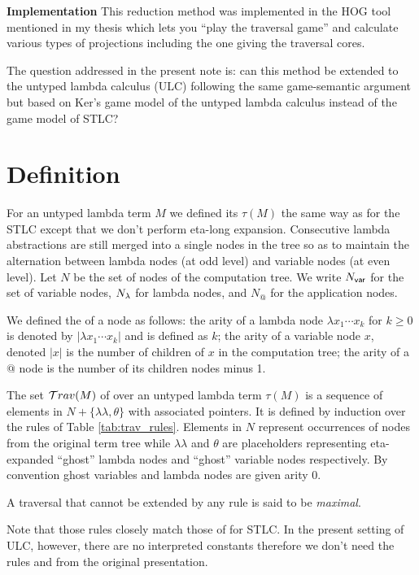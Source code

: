 \documentclass{article}
\theoremstyle{definition}
\newcommand\Nodes{N}%
\newcommand{\ghostlmd}{{\lambda\!\!\lambda}}
\newcommand{\ghostvar}{\theta}
\begin{document}
\textbf{Implementation}
This reduction method was implemented in the HOG tool mentioned in my thesis which lets you ``play the traversal game'' and calculate various types of projections including the one giving the traversal cores.

The question addressed in the present note is: can this method be extended to the untyped lambda calculus (ULC) following the same game-semantic argument but based on Ker's game model of the untyped lambda calculus instead of the game model of STLC?


\section{Definition}

For an untyped lambda term $M$ we defined its  $\tau(M)$ the same way as for the STLC
except that we don't perform eta-long expansion. Consecutive lambda abstractions are still merged into a single nodes in the tree so as to maintain the alternation between lambda nodes (at odd level) and variable nodes (at even level).
Let $\Nodes$ be the set of nodes of the computation tree. We write $\Nodes_{\sf var}$ for the set of variable nodes, $\Nodes_{\sf \lambda}$ for lambda nodes, and $\Nodes_{@}$ for the application nodes.

We defined the  of a node as follows: the arity of a lambda node $\lambda x_1 \cdots x_k$ for $k\geq 0$ is denoted by $|\lambda x_1 \cdots x_k|$ and is defined as $k$; the arity of a variable node $x$, denoted $|x|$ is the number of children of $x$ in the computation tree; the arity of a $@$ node is the number of its children nodes minus 1.

The set $\mathcal{T}rav(M)$ of  over an untyped lambda term $\tau(M)$ is a sequence of elements in $\Nodes + \{ \ghostlmd, \ghostvar \}$ with associated pointers. It is defined by induction over the rules of Table \ref{tab:trav_rules}.
Elements in $N$ represent occurrences of nodes from the original term tree while $\ghostlmd$ and $\ghostvar$ are placeholders representing eta-expanded ``ghost'' lambda nodes and ``ghost'' variable nodes respectively.
By convention ghost variables and lambda nodes are given arity $0$.

A traversal that cannot be extended by any rule is said to be \emph{maximal}.

Note that those rules closely match those of \cite{BlumPhd} for STLC. In the present setting of ULC, however, there are no interpreted constants therefore we don't need the rules  and  from the original presentation.
\end{document}
